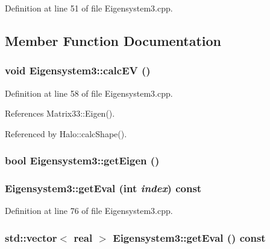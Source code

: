 Definition at line 51 of file Eigensystem3.cpp.



\subsection{Member Function Documentation}
\subsubsection[{calcEV}]{\setlength{\rightskip}{0pt plus 5cm}void Eigensystem3::calcEV ()}\label{classEigensystem3_adc1e3e6fdbe879e34fa403468eb0800f}


Definition at line 58 of file Eigensystem3.cpp.



References Matrix33::Eigen().



Referenced by Halo::calcShape().

\subsubsection[{getEigen}]{\setlength{\rightskip}{0pt plus 5cm}bool Eigensystem3::getEigen ()}\label{classEigensystem3_af65d8d9d661b4ba74f2553227bfc16fb}
\subsubsection[{getEval}]{ Eigensystem3::getEval (int {\em index}) const}\label{classEigensystem3_a81e7fd6be94263e763437c9be028c660}


Definition at line 76 of file Eigensystem3.cpp.

\subsubsection[{getEval}]{\setlength{\rightskip}{0pt plus 5cm}std::vector$<$ {\bf real} $>$ Eigensystem3::getEval () const}\label{classEigensystem3_a5f76eedf7a13ebb22f59104fe31f808c}


